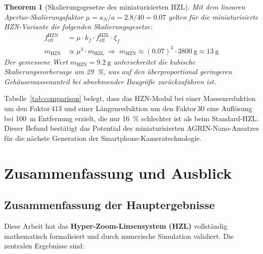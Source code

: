 ﻿\documentclass[12pt,a4paper]{article}
\newtheorem{theorem}{Theorem}[section]
\theoremstyle{definition}
\newcommand{\eff}{\mathrm{eff}}
\begin{document}
	\begin{theorem}[Skalierungsgesetze des miniaturisierten HZL]
		Mit dem linearen Apertur-Skalierungsfaktor
		$\mu = a_N/a = 2.8/40 = 0.07$ gelten f\"ur die miniaturisierte
		HZN-Variante die folgenden Skalierungsgesetze:
		\begin{align}
			f_\eff^\mathrm{HZN}
			&= \mu \cdot k_f \cdot f_\eff^\mathrm{HZL} \cdot \xi_f
			\label{eq:scale_f}\\
			m_\mathrm{HZN}
			&\propto \mu^3 \cdot m_\mathrm{HZL}
			\;\Rightarrow\;
			m_\mathrm{HZN}
			\approx (0.07)^3 \cdot \SI{3800}{\gram}
			\approx \SI{13}{\gram}
			\label{eq:scale_m}
		\end{align}
		Der gemessene Wert $m_\mathrm{HZN} = \SI{9.2}{\gram}$ unterschreitet
		die kubische Skalierungsvorhersage um \SI{29}{\percent}, was auf den
		\"uberproportional geringeren Geh\"ausemassenanteil bei abnehmender
		Baugr\"o{\ss}e zur\"uckzuf\"uhren ist.
	\end{theorem}

	Tabelle~\ref{tab:comparison} belegt, dass das HZN-Modul bei einer
	Massenreduktion um den Faktor\,413 und einer L\"angenreduktion um den
	Faktor\,30 eine Aufl\"osung bei \SI{100}{\metre} Entfernung erzielt,
	die nur \SI{16}{\percent} schlechter ist als beim Standard-HZL.
	Dieser Befund best\"atigt das Potential des miniaturisierten
	AGRIN-Nano-Ansatzes f\"ur die n\"achste Generation der
	Smartphone-Kamera\-technologie.

	\section{Zusammenfassung und Ausblick}
	
	\subsection{Zusammenfassung der Hauptergebnisse}
	
	Diese Arbeit hat das \textbf{Hyper-Zoom-Linsensystem (HZL)} vollständig
	mathematisch formalisiert und durch numerische Simulation validiert.
	Die zentralen Ergebnisse sind:
	
\end{document}
